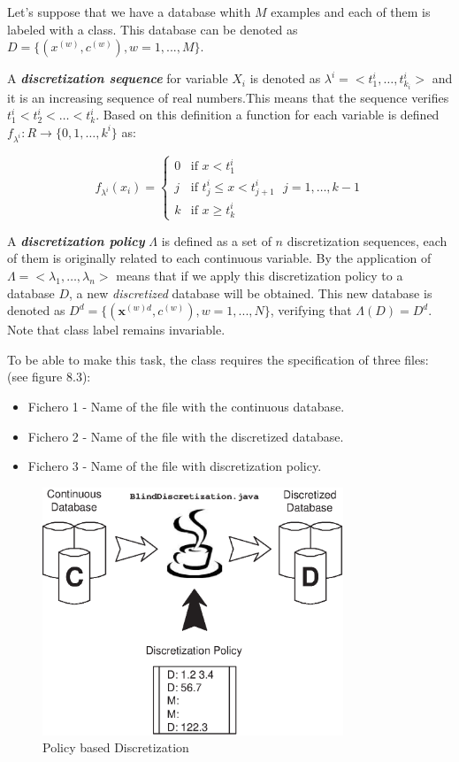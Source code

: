 Let's suppose that we have a database whith $M$ examples and each of them is labeled
with a class. This database can be denoted as $D=\{(x^{(w)},c^{(w)}), w=1,...,M\}$. 

A \emph{\textbf{discretization sequence}} for variable $X_{i}$ is denoted as $\lambda^{i}=<t_{1}^{i},\ldots,t_{k_{i}}^{i}>$ 
and it is an increasing sequence of real numbers.This means that the sequence verifies 
$t_{1}^{i}<t_{2}^{i}<\ldots<t_{k}^{i}$. Based on this definition a function for each variable is 
defined $f_{{\lambda}^{i}}: R \rightarrow  \{ 0,1,\ldots,k^{i} \}$ as:

\begin{equation}
f_{\lambda^{i}}(x_{i})=
	\begin{cases}
		0& \text{if }  x<t_{1}^{i} \\
		j& \text{if $t_{j}^{i} \leq x < t_{j+1}^{i}$ $j=1,\ldots,k-1$}\\
		k& \text{if } x \geq t_{k}^{i} 
	\end{cases}
\end{equation}

A \emph{\textbf{discretization policy}} $\Lambda$ is defined as a set of $n$ discretization sequences, each of them
is originally related to each continuous variable.  By the application of 
$\Lambda=<\lambda_{1},\ldots,\lambda_{n}>$ means that if we apply this discretization 
policy to a database $D$, a new \emph{discretized} database will be obtained. This new database is 
denoted as $D^{d}=\{(\mathbf{x}^{(w)d},c^{(w)}), w=1,...,N\}$, verifying that $\Lambda(D)=D^{d}$. Note that 
class label remains invariable.
	
To be able to make this task, the class requires the specification of three files:
(see figure 8.3):
\begin{itemize}
	\item	Fichero 1 - Name of the file with the continuous database.
	\item	Fichero 2 - Name of the file with the discretized database.
	\item	Fichero 3 - Name of the file with discretization policy.
\end{itemize}

\begin{figure}
\label{cap08:03}
\begin{center}
\includegraphics[width=90mm]{Learning/Preprocessing/fig/figure-8.03.ps} 
\end{center}
\caption{Policy based Discretization}
\end{figure}

